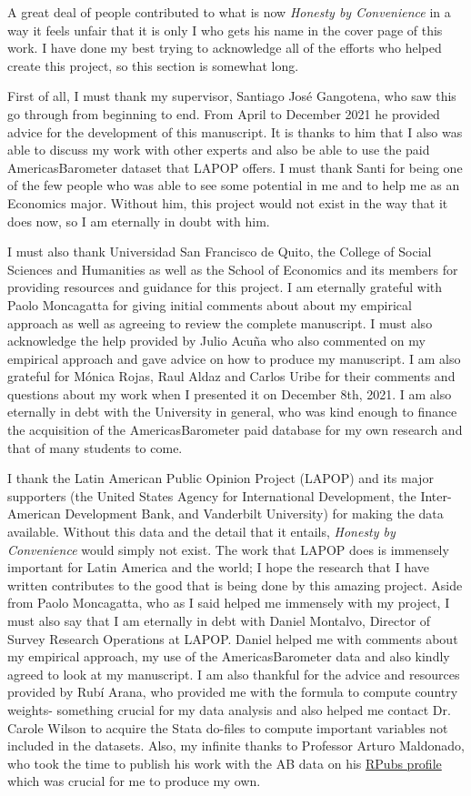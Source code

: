 \documentclass[floatsintext,man]{apa7}\usepackage[]{graphicx}\usepackage[]{color}
\begin{document}
A great deal of people contributed to what is now \textit{Honesty by Convenience} in a way it feels unfair that it is only I who gets his name in the cover page of this work. I have done my best trying to acknowledge all of the efforts who helped create this project, so this section is somewhat long. 

First of all, I must thank my supervisor, Santiago José Gangotena, who saw this go through from beginning to end. From April to December 2021 he provided advice for the development of this manuscript. It is thanks to him that I also was able to discuss my work with other experts and also be able to use the paid AmericasBarometer dataset that LAPOP offers. I must thank Santi for being one of the few people who was able to see some potential in me and to help me as an Economics major. Without him, this project would not exist in the way that it does now, so I am eternally in doubt with him. 

I must also thank Universidad San Francisco de Quito, the College of Social Sciences and Humanities as well as the School of Economics and its members for providing resources and guidance for this project. I am eternally grateful with Paolo Moncagatta for giving initial comments about about my empirical approach as well as agreeing to review the complete manuscript. I must also acknowledge the help provided by Julio Acuña who also commented on my empirical approach and gave advice on how to produce my manuscript. I am also grateful for Mónica Rojas, Raul Aldaz and Carlos Uribe for their comments and questions about my work when I presented it on December 8th, 2021. I am also eternally in debt with the University in general, who was kind enough to finance the acquisition of the AmericasBarometer paid database for my own research and that of many students to come. 

I thank the Latin American Public Opinion Project (LAPOP) and its major supporters (the United States Agency for International Development, the Inter-American Development Bank, and Vanderbilt University) for making the data available. Without this data and the detail that it entails, \textit{Honesty by Convenience} would simply not exist. The work that LAPOP does is immensely important for Latin America and the world; I hope the research that I have written contributes to the good that is being done by this amazing project. Aside from Paolo Moncagatta, who as I said helped me immensely with my project, I must also say that I am eternally in debt with Daniel Montalvo, Director of Survey Research Operations at LAPOP. Daniel helped me with comments about my empirical approach, my use of the AmericasBarometer data and also kindly agreed to look at my manuscript. I am also thankful for the advice and resources provided by Rubí Arana, who provided me with the formula to compute country weights- something crucial for my data analysis and also helped me contact Dr. Carole Wilson to acquire the Stata do-files to compute important variables not included in the datasets. Also, my infinite thanks to Professor Arturo Maldonado, who took the time to publish his work with the AB data on his \href{https://rpubs.com/arturo_maldonado}{RPubs profile} which was crucial for me to produce my own. 
\end{document}
